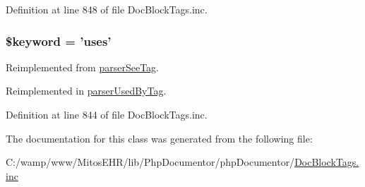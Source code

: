 \-Definition at line 848 of file \-Doc\-Block\-Tags.\-inc.

\hypertarget{classparser_uses_tag_a4a925d6b38bcf3957c713a7d3dc7da1f}{
\subsubsection[{\$keyword}]{\setlength{\rightskip}{0pt plus 5cm}\$keyword = 'uses'}}\label{classparser_uses_tag_a4a925d6b38bcf3957c713a7d3dc7da1f}


\-Reimplemented from \hyperlink{classparser_see_tag_a4a925d6b38bcf3957c713a7d3dc7da1f}{parser\-See\-Tag}.



\-Reimplemented in \hyperlink{classparser_used_by_tag_a4a925d6b38bcf3957c713a7d3dc7da1f}{parser\-Used\-By\-Tag}.



\-Definition at line 844 of file \-Doc\-Block\-Tags.\-inc.



\-The documentation for this class was generated from the following file\-:\begin{DoxyCompactItemize}
\item 
\-C\-:/wamp/www/\-Mitos\-E\-H\-R/lib/\-Php\-Documentor/php\-Documentor/\hyperlink{_doc_block_tags_8inc}{\-Doc\-Block\-Tags.\-inc}\end{DoxyCompactItemize}
